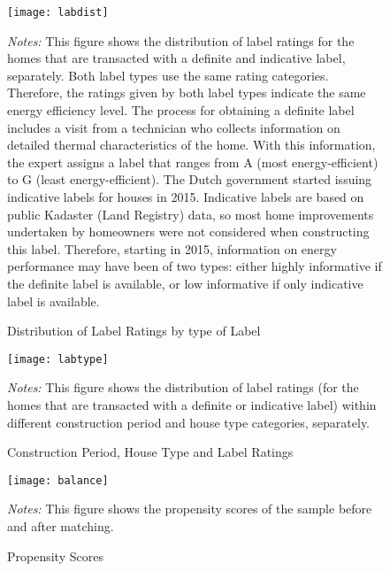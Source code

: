 \documentclass[12pt]{article}
\begin{document}
\begin{figure}[H]
\footnotesize
\caption{Distribution of Label Ratings by type of Label}
\begin{center}
\texttt{[image: labdist]}
		\scriptsize
		\begin{tablenotes}
		\scriptsize
\item \textit{Notes:} This figure shows the distribution of label ratings for the homes that are transacted with a definite and indicative label, separately. Both label types use the same rating categories. Therefore, the ratings given by both label types indicate the same energy efficiency level. The process for obtaining a definite label includes a visit from a technician who collects information on detailed thermal characteristics of the home. With this information, the expert assigns a label that ranges from A (most energy-efficient) to G (least energy-efficient). The Dutch government started issuing indicative labels for houses in 2015. Indicative labels are based on public Kadaster (Land Registry) data, so most home improvements undertaken by homeowners were not considered when constructing this label. Therefore, starting in 2015, information on energy performance may have been of two types: either highly informative if the definite label is available, or low informative if only indicative label is available. 


\end{tablenotes}
		
\end{center}
\end{figure}



\begin{figure}[H]
\footnotesize
\caption{Construction Period, House Type and Label Ratings}
\begin{center}
\texttt{[image: labtype]}
		\scriptsize
		\begin{tablenotes}
		\scriptsize
\item \textit{Notes:} This figure shows the distribution of label ratings (for the homes that are transacted with a definite or indicative label) within different construction period and house type categories, separately.
\end{tablenotes}
		
\end{center}
\end{figure}



\begin{figure}[H]
\footnotesize
\caption{Propensity Scores}
\begin{center}
\texttt{[image: balance]}
		\scriptsize
		\begin{tablenotes}
		\scriptsize
\item \textit{Notes:} This figure shows the propensity scores of the sample before and after matching.
\end{tablenotes}
		
\end{center}
\end{figure}
\end{document}

